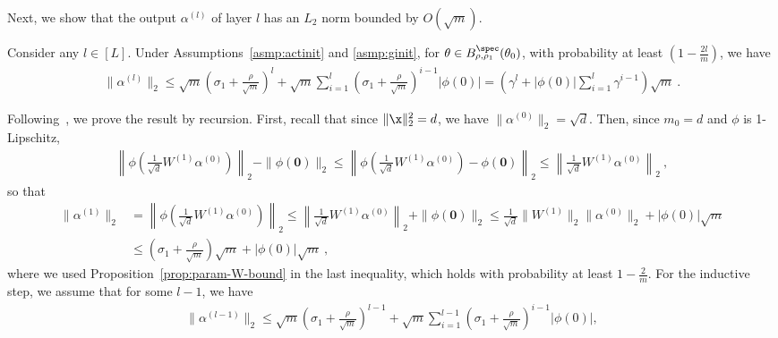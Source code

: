 Next, we show that the output $\alpha^{(l)}$ of layer $l$ has an $L_2$ norm bounded by $O(\sqrt{m})$.
%
\begin{lemm}
Consider any $l\in[L]$. 
Under Assumptions~\ref{asmp:actinit} and \ref{asmp:ginit}, for $\theta \in B_{\rho,\rho_1}^{\spec}(\theta_0)$, with probability at least $\left(1 - \frac{2l}{m} \right)$, we have
\begin{align*}
\| \alpha^{(l)}\|_2 \leq \sqrt{m}\left(\sigma_1 + \frac{\rho}{\sqrt{m}} \right)^l + \sqrt{m} \sum_{i=1}^l  \left(\sigma_1 + \frac{\rho}{\sqrt{m}} \right)^{i-1} |\phi(0)| =  \left( \gamma^l +  | \phi(0)| \sum_{i=1}^l \gamma^{i-1} \right) \sqrt{m} ~. 
\end{align*}
\label{lemm:outl2}
\end{lemm}
%
%
\proof Following~\cite{ZAZ-YL-ZS:19,CL-LZ-MB:20}, we prove the result by recursion. First, recall that since $\| \x\|_2^2 = d$, we have $\| \alpha^{(0)}\|_2 = \sqrt{d}$. Then, since $m_0 = d$ and $\phi$ is 1-Lipschitz,
\begin{align*}
\left\|\phi\left( \frac{1}{\sqrt{d}} W^{(1)} \alpha^{(0)} \right) \right\|_2 - \| \phi(\mathbf{0}) \|_2 
\leq \left\|\phi\left( \frac{1}{\sqrt{d}} W^{(1)} \alpha^{(0)} \right) - \phi(\mathbf{0}) \right\|_2 \leq \left\|  \frac{1}{\sqrt{d}} W^{(1)} \alpha^{(0)} \right\|_2 ~,
\end{align*}
so that
\begin{align*}
\| \alpha^{(1)}\|_2 & = \left\| \phi\left( \frac{1}{\sqrt{d}} W^{(1)} \alpha^{(0)} \right) \right\|_2
 \leq  \left\|  \frac{1}{\sqrt{d}} W^{(1)} \alpha^{(0)} \right\|_2 + \| \phi(\mathbf{0}) \|_2 
\leq  \frac{1}{\sqrt{d}} \| W^{(1)} \|_2 \|\alpha^{(0)} \|_2 + |\phi(0)| \sqrt{m} \\
& \leq \left( \sigma_1 + \frac{\rho}{\sqrt{m}}\right) \sqrt{m} + |\phi(0)| \sqrt{m}~,
\end{align*}
where we used Proposition~\ref{prop:param-W-bound} in the last inequality, which holds with probability at least $1-\frac{2}{m}$. For the inductive step, we assume that for some $l-1$, we have 
\begin{align*}
\| \alpha^{(l-1)}\|_2 \leq \sqrt{m} \left( \sigma_1 + \frac{\rho}{\sqrt{m}}\right)^{l-1}  + \sqrt{m} \sum_{i=1}^{l-1}  \left(\sigma_1 + \frac{\rho}{\sqrt{m}} \right)^{i-1} |\phi(0)|, 
\end{align*}
